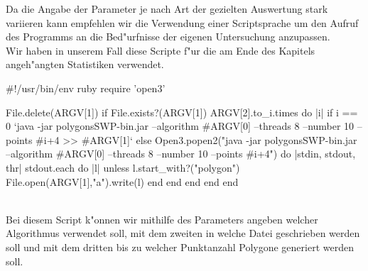     Da die Angabe der Parameter je nach Art der gezielten Auswertung stark
    variieren kann empfehlen wir die Verwendung einer Scriptsprache um den
    Aufruf des Programms an die Bed"urfnisse der eigenen Untersuchung 
    anzupassen.\\
    Wir haben in unserem Fall diese Scripte f"ur die am Ende des Kapitels 
    angeh"angten Statistiken verwendet.\\
    \begin{code}[caption={Script zur Datenerzeugung},label=listing_datacreation]
#!/usr/bin/env ruby
require 'open3'

File.delete(ARGV[1]) if File.exists?(ARGV[1])
ARGV[2].to_i.times do |i|
  if i == 0
    `java -jar polygonsSWP-bin.jar --algorithm #{ARGV[0]} --threads 8 --number 10 --points #{i+4} >> #{ARGV[1]}`
  else
    Open3.popen2("java -jar polygonsSWP-bin.jar --algorithm #{ARGV[0]} --threads 8 --number 10 --points #{i+4}") do |stdin, stdout, thr|
      stdout.each do |l|
        unless l.start_with?("polygon")
          File.open(ARGV[1],"a").write(l)
        end
      end
    end
  end
end
    \end{code}\\
    Bei diesem Script k"onnen wir mithilfe des Parameters angeben welcher
    Algorithmus verwendet soll, mit dem zweiten in welche Datei geschrieben 
    werden soll und mit dem dritten bis zu welcher Punktanzahl Polygone
    generiert werden soll.
